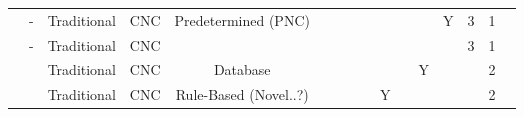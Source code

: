 \begin{tabular}{lccccccccccccccc}
 & -                                                                                                       & Traditional & CNC             & Predetermined (PNC)               &             &            &           &           &               &            &              & Y         & 3   & 1           &          \\
 & -                                                                                                       & Traditional & CNC             &                                   &             &            &           &           &               &            &              &           & 3   & 1           &          \\
 & \citep{Henkenjohann2005AnProcess}                                                                               & Traditional & CNC             & Database                          &             &            &           &           &               &            & Y            &           &     & 2           &          \\
 & \citep{Polyblank2015ParametricSpinning}                                                                         & Traditional & CNC             & Rule-Based (Novel..?)             &             &            &           &           & Y             &            &              &           &     & 2           &         \\
 \bottomrule
\end{tabular}